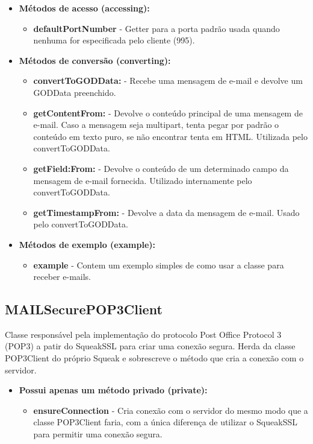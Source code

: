 \begin{itemize}
	\item \textbf{Métodos de acesso (accessing):}
	\begin{itemize}
		\item \textbf{defaultPortNumber} - Getter para a porta padrão usada quando nenhuma for especificada pelo cliente (995).
	\end{itemize}
	\item \textbf{Métodos de conversão (converting):} 
	\begin{itemize}
		\item \textbf{convertToGODData:} - Recebe uma mensagem de e-mail e devolve um GODData preenchido.
		\item \textbf{getContentFrom:} - Devolve o conteúdo principal de uma mensagem de e-mail. Caso a mensagem seja multipart, tenta pegar por padrão o conteúdo em texto puro, se não encontrar tenta em HTML. Utilizada pelo convertToGODData.
		\item \textbf{getField:From:} - Devolve o conteúdo de um determinado campo da mensagem de e-mail fornecida. Utilizado internamente pelo convertToGODData.
		\item \textbf{getTimestampFrom:} - Devolve a data da mensagem de e-mail. Usado pelo convertToGODData.
	\end{itemize}
	\item \textbf{Métodos de exemplo (example):}
	\begin{itemize}
		\item \textbf{example} - Contem um exemplo simples de como usar a classe para receber e-mails.
	\end{itemize}
\end{itemize}

\subsection{MAILSecurePOP3Client}

Classe responsável pela implementação do protocolo Post Office Protocol 3 (POP3) a patir do SqueakSSL para criar uma conexão segura. Herda da classe POP3Client do próprio Squeak e sobrescreve o método que cria a conexão com o servidor.

\begin{itemize}
	\item \textbf{Possui apenas um método privado (private):}
	\begin{itemize}
		\item \textbf{ensureConnection} - Cria conexão com o servidor do mesmo modo que a classe POP3Client faria, com a única diferença de utilizar o SqueakSSL para permitir uma conexão segura.
	\end{itemize}
\end{itemize}
